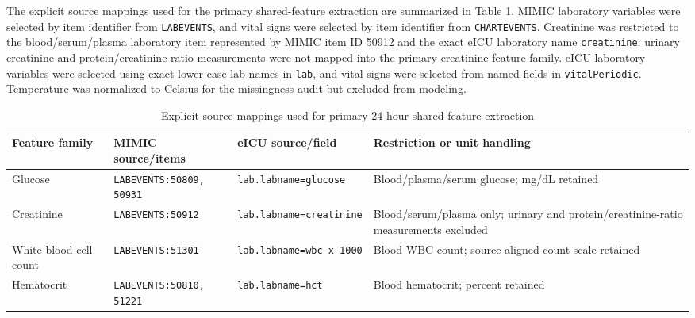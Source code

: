 \documentclass[utf8]{FrontiersinHarvard} %
\begin{document}
The explicit source mappings used for the primary shared-feature extraction are summarized in Table 1. MIMIC laboratory variables were selected by item identifier from \texttt{LABEVENTS}, and vital signs were selected by item identifier from \texttt{CHARTEVENTS}. Creatinine was restricted to the blood/serum/plasma laboratory item represented by MIMIC item ID 50912 and the exact eICU laboratory name \texttt{creatinine}; urinary creatinine and protein/creatinine-ratio measurements were not mapped into the primary creatinine feature family. eICU laboratory variables were selected using exact lower-case lab names in \texttt{lab}, and vital signs were selected from named fields in \texttt{vitalPeriodic}. Temperature was normalized to Celsius for the missingness audit but excluded from modeling.

\begin{table}[h]
	\caption{Explicit source mappings used for primary 24-hour shared-feature extraction}
	\label{tab:source_mapping}
	\setlength{\tabcolsep}{4pt}
	\footnotesize
	\begin{tabular}{>{\raggedright\arraybackslash}p{}>{\raggedright\arraybackslash}p{}>{\raggedright\arraybackslash}p{}>{\raggedright\arraybackslash}p{}}
		\hline
		\textbf{Feature family} & \textbf{MIMIC source/items} & \textbf{eICU source/field} & \textbf{Restriction or unit handling} \\ \hline
		Glucose & \texttt{LABEVENTS:}\newline \texttt{50809, 50931} & \texttt{lab.labname=}\newline \texttt{glucose} & Blood/plasma/serum glucose; mg/dL retained \\
		Creatinine & \texttt{LABEVENTS:}\newline \texttt{50912} & \texttt{lab.labname=}\newline \texttt{creatinine} & Blood/serum/plasma only; urinary and protein/creatinine-ratio measurements excluded \\
		White blood cell count & \texttt{LABEVENTS:}\newline \texttt{51301} & \texttt{lab.labname=}\newline \texttt{wbc x 1000} & Blood WBC count; source-aligned count scale retained \\
		Hematocrit & \texttt{LABEVENTS:}\newline \texttt{50810, 51221} & \texttt{lab.labname=}\newline \texttt{hct} & Blood hematocrit; percent retained \\

\end{tabular}
\end{table}
\end{document}
